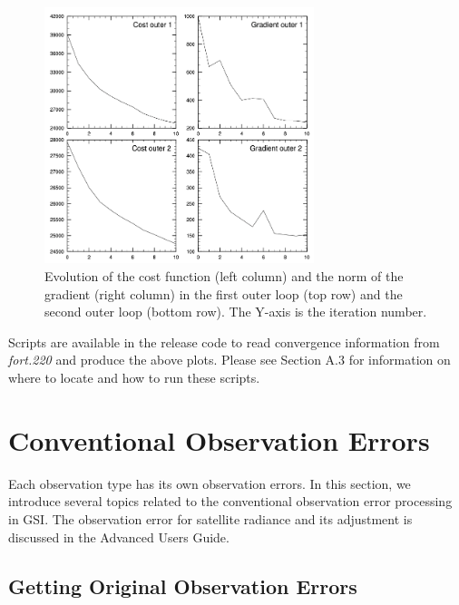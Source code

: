 \begin{enumerate}
\begin{figure}[h!]
  \centering
  \includegraphics[width=0.7\textwidth]{images/CostGrad}
  \caption{Evolution of the cost function (left column) and the norm of the gradient (right column) in the first outer loop (top row) and the second outer loop (bottom row). The Y-axis is the iteration number.}
  \label{fig:costgrad}
\end{figure}

Scripts are available in the release code to read convergence information from \textit{fort.220} and produce the above plots. Please see Section A.3 for information on where to locate and how to run these scripts.
\end{enumerate}

\section{Conventional Observation Errors}

Each observation type has its own observation errors. In this section, we introduce several topics related to the conventional observation error processing in GSI. The observation error for satellite radiance and its adjustment is discussed in the Advanced User\textquotesingle s Guide.

\subsection{Getting Original Observation Errors}
\label{sec4.7.1}

